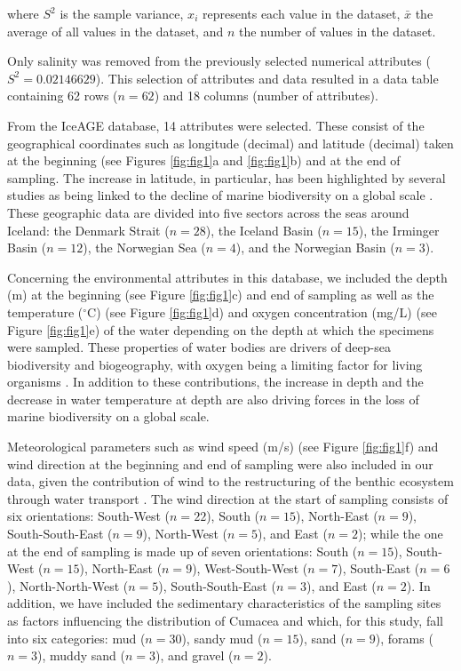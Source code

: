 where $S^2$ is the sample variance, $x_i$ represents each value in the dataset, $\bar{x}$ the average of all values in the dataset, and $n$ the number of values in the dataset.

Only salinity was removed from the previously selected numerical attributes ($S^2 = 0.02146629$). This selection of attributes and data resulted in a data table containing 62 rows ($n=62$) and 18 columns (number of attributes). 

From the IceAGE database, 14 attributes were selected. These consist of the geographical coordinates such as longitude (decimal) and latitude (decimal) taken at the beginning (see Figures \ref{fig:fig1}a and \ref{fig:fig1}b) and at the end of sampling. The increase in latitude, in particular, has been highlighted by several studies as being linked to the decline of marine biodiversity on a global scale \citep{lambshead_latitudinal_2000, gage_diversity_2004}. These geographic data are divided into five sectors across the seas around Iceland: the Denmark Strait ($n=28$), the Iceland Basin ($n=15$), the Irminger Basin ($n=12$), the Norwegian Sea ($n=4$), and the Norwegian Basin ($n=3$). 

Concerning the environmental attributes in this database, we included the depth (m) at the beginning (see Figure \ref{fig:fig1}c) and end of sampling as well as the temperature ($^\circ$C) (see Figure \ref{fig:fig1}d) and oxygen concentration (mg/L) (see Figure \ref{fig:fig1}e) of the water depending on the depth at which the specimens were sampled. These properties of water bodies are drivers of deep-sea biodiversity and biogeography, with oxygen being a limiting factor for living organisms \citep{keeling_ocean_2010}. In addition to these contributions, the increase in depth \citep{rex_global_2006,costello_marine_2017} and the decrease in water temperature at depth \citep{lambshead_latitudinal_2000} are also driving forces in the loss of marine biodiversity on a global scale.

Meteorological parameters such as wind speed (m/s) (see Figure \ref{fig:fig1}f) and wind direction at the beginning and end of sampling were also included in our data, given the contribution of wind to the restructuring of the benthic ecosystem through water transport \citep{waga_recent_2020,saeedi_environmental_2022}. The wind direction at the start of sampling consists of six orientations: South-West ($n=22$), South ($n=15$), North-East ($n=9$), South-South-East ($n=9$), North-West ($n=5$), and East ($n=2$); while the one at the end of sampling is made up of seven orientations: South ($n=15$), South-West ($n=15$), North-East ($n=9$), West-South-West ($n=7$), South-East ($n=6$), North-North-West ($n=5$), South-South-East ($n=3$), and East ($n=2$). In addition, we have included the sedimentary characteristics of the sampling sites as factors influencing the distribution of Cumacea \citep{uhlir_adding_2021} and which, for this study, fall into six categories: mud ($n=30$), sandy mud ($n=15$), sand ($n=9$), forams ($n=3$), muddy sand ($n=3$), and gravel ($n=2$).

